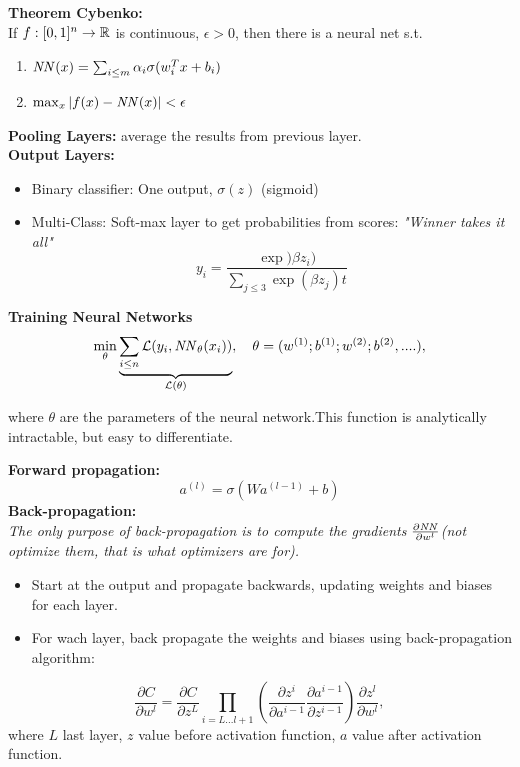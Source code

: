 \textbf{Theorem Cybenko:}\\
If $f: [0,1]^n\to\mathbb R$ is continuous, $\epsilon > 0$, then there is a neural net s.t.
\begin{enumerate}
	\item $\mathit{NN}(x) = \sum_{i\leq m} \alpha_i\sigma(w_i^Tx + b_i)$
	\item $\max_x |f(x) - \mathit{NN}(x)| < \epsilon$ 
\end{enumerate}
\vspace{1em}

\textbf{Pooling Layers: } average the results from previous layer. \\
\textbf{Output Layers: }
\begin{itemize}
	\item Binary classifier: One output, $\sigma(z)$ (sigmoid)
	\item Multi-Class: Soft-max layer to get probabilities from scores: 
	\textit{"Winner takes it all"}
	$$
		y_i= \frac{\exp)\beta z_i)}{\sum_{j\leq 3}\exp(\beta z_j)t}
	$$
	
\end{itemize}
\vspace{1em}
\textbf{Training Neural Networks}
\begin{equation*}
	\min_\theta \underbrace{\sum_{i\leq n} \mathcal L(y_i, \mathit{NN}_\theta(x_i))}_{\mathcal L(\theta)}, \quad \theta = (w^{( 1)}; b^{(1)}; w^{(2)}; b^{(2)}, ....),
\end{equation*}

where $\theta$ are the parameters of the neural network.This function is analytically intractable, but easy to differentiate.

\vspace{1em}
\textbf{Forward propagation: }
$$
	a^{(l)} = \sigma(Wa^{(l-1)} + b)
$$
\textbf{Back-propagation: }\\
\textit{The only purpose of back-propagation is to compute the gradients $\frac{\partial\mathit{NN}}{\partial w^l}$(not optimize them, that is what optimizers are for).}
\begin{itemize}
  \item Start at the output and propagate backwards, updating weights and biases for each layer.
  \item For wach layer, back propagate the weights and biases using back-propagation algorithm: 
\end{itemize}

$$
\frac{\partial C}{\partial w^l} = \frac{\partial C}{\partial z^L} \prod_{i=L...l+1}\left(\frac{\partial z^i}{\partial a^{i-1}}\frac{\partial a^{i-1}}{\partial z^{i-1}}\right)\frac{\partial z^l}{\partial w^l},
$$
where $L$ last layer, $z$ value before activation function, $a$ value after activation function.


